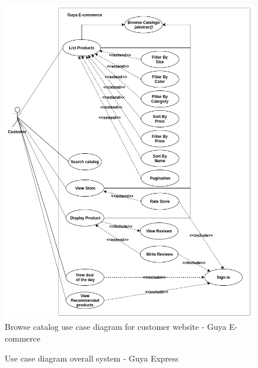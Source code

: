 \begin{figure}[!ht]
\centering
\includegraphics[width=15cm,keepaspectratio]{usecases/brwose_catalog}
\caption{Browse catalog use case diagram for customer website - Guya E-commerce}
\end{figure}


\begin{figure}[!h]
\hspace*{-3cm}
\caption{Use case diagram overall system - Guya Express}
\end{figure}
\clearpage

